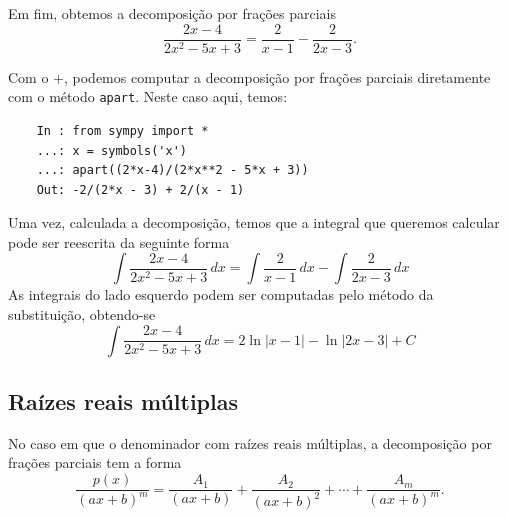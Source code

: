 \begin{ex}
  Em fim, obtemos a decomposição por frações parciais
  \begin{equation}
    \frac{2x-4}{2x^2 - 5x + 3} = \frac{2}{x-1} - \frac{2}{2x-3}.
  \end{equation}

  \ifispython
  Com o {\python}+{\sympy}, podemos computar a decomposição por frações parciais diretamente com o método \lstinline+apart+. Neste caso aqui, temos:
  \begin{lstlisting}
    In : from sympy import *
    ...: x = symbols('x')
    ...: apart((2*x-4)/(2*x**2 - 5*x + 3))
    Out: -2/(2*x - 3) + 2/(x - 1)
  \end{lstlisting}
  \fi

  Uma vez, calculada a decomposição, temos que a integral que queremos calcular pode ser reescrita da seguinte forma
  \begin{equation}
    \int\frac{2x-4}{2x^2 - 5x + 3}\,dx = \int\frac{2}{x-1}\,dx - \int\frac{2}{2x-3}\,dx
  \end{equation}
  As integrais do lado esquerdo podem ser computadas pelo método da substituição, obtendo-se
  \begin{equation}
    \int\frac{2x-4}{2x^2 - 5x + 3}\,dx = 2\ln|x-1| - \ln|2x-3| + C
  \end{equation}
\end{ex}

\subsection{Raízes reais múltiplas}

No caso em que o denominador com raízes reais múltiplas, a decomposição por frações parciais tem a forma
\begin{equation}
  \frac{p(x)}{(ax+b)^m} = \frac{A_1}{(ax+b)} + \frac{A_2}{(ax+b)^2} + \cdots + \frac{A_m}{(ax+b)^m}. 
\end{equation}

